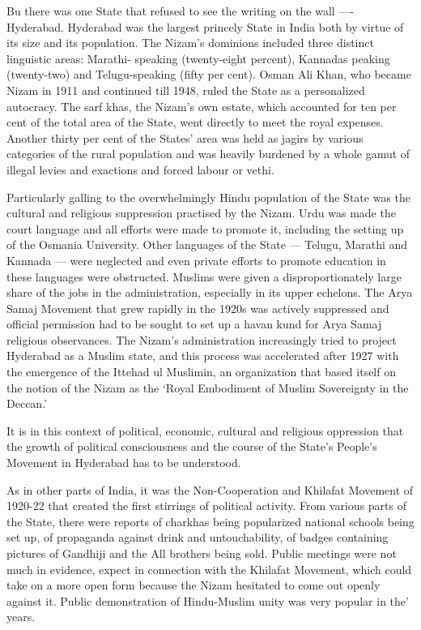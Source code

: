Bu there was one State that refused to see the writing on the wall —- Hyderabad. Hyderabad was the largest princely State in India both by virtue of its size and its population. The Nizam’s dominions included three distinct linguistic areas: Marathi- speaking (twenty-eight percent), Kannadas peaking (twenty-two) and Telugu-speaking (fifty per cent). Osman Ali Khan, who became Nizam in 1911 and continued till 1948, ruled the State as a personalized autocracy. The sarf khas, the Nizam’s own estate, which accounted for ten per cent of the total area of the State, went directly to meet the royal expenses. Another thirty per cent of the States’ area was held as jagirs by various categories of the rural population and was heavily burdened by a whole gamut of illegal levies and exactions and forced labour or vethi. 

Particularly galling to the overwhelmingly Hindu population of the State was the cultural and religious suppression practised by the Nizam. Urdu was made the court language and all efforts were made to promote it, including the setting up of the Osmania University. Other languages of the State — Telugu, Marathi and Kannada — were neglected and even private efforts to promote education in these languages were obstructed. Muslims were given a disproportionately large share of the jobs in the administration, especially in its upper echelons. The Arya Samaj Movement that grew rapidly in the 1920s was actively suppressed and official permission had to be sought to set up a havan kund for Arya Samaj religious observances. The Nizam’s administration increasingly tried to project Hyderabad as a Muslim state, and this process was accelerated after 1927 with the emergence of the Ittehad ul Muslimin, an organization that based itself on the notion of the Nizam as the ‘Royal Embodiment of Muslim Sovereignty in the Deccan.’ 

It is in this context of political, economic, cultural and religious oppression that the growth of political consciousness and the course of the State’s People’s Movement in Hyderabad has to be understood. 

As in other parts of India, it was the Non-Cooperation and Khilafat Movement of 1920-22 that created the first stirrings of political activity. From various parts of the State, there were reports of charkhas being popularized national schools being set up, of propaganda against drink and untouchability, of badges containing pictures of Gandhiji and the All brothers being sold. Public meetings were not much in evidence, expect in connection with the Khilafat Movement, which could take on a more open form because the Nizam hesitated to come out openly against it. Public demonstration of Hindu-Muslim unity was very popular in the’ years. 

